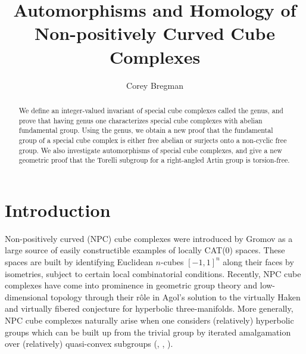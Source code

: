 \documentclass[11pt]{amsart}
\title{Automorphisms and Homology of Non-positively Curved Cube Complexes}
\author{Corey Bregman}
\numberwithin{thm}{section}
\theoremstyle{remark}
\theoremstyle{definition}
\begin{document}
\maketitle
\begin{abstract}

We define an integer-valued invariant of special cube complexes called the genus, and prove that having genus one characterizes special cube complexes with abelian fundamental group.  Using the genus, we obtain a new proof that the fundamental group of a special cube complex is either free abelian or surjects onto a non-cyclic free group. We also investigate automorphisms of special cube complexes, and give a new geometric proof that the Torelli subgroup for a right-angled Artin group is torsion-free.

\end{abstract}

\section{Introduction}
Non-positively curved (NPC) cube complexes were introduced by Gromov \cite{Gro87} as a large source of easily constructible examples of locally CAT(0) spaces. These spaces are built by identifying Euclidean $n$-cubes $[-1,1]^n$ along their faces by isometries, subject to certain local combinatorial conditions. Recently, NPC cube complexes have come into prominence in geometric group theory and low-dimensional topology through their r\^{o}le in Agol's solution \cite{Ag13} to the virtually Haken and virtually fibered conjecture for hyperbolic three-manifolds. More generally, NPC cube complexes naturally arise when one considers (relatively) hyperbolic groups which can be built up from the trivial group by iterated amalgamation over (relatively) quasi-convex subgroups (\cite{WiseQCH}, \cite{Ag13}, \cite{AGM16}). 
\end{document}
